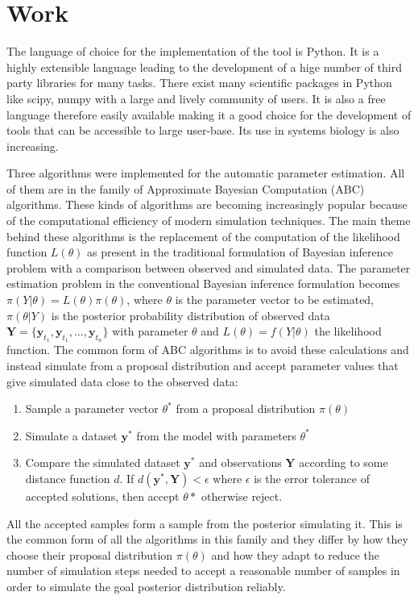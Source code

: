 \documentclass[12pt,a4paper,titlepage]{article}
\begin{document}
\section{Work}
The language of choice for the implementation of the tool is Python. It is a highly extensible language leading to the development of a hige number of third party libraries for many tasks. There exist many scientific packages in Python like scipy\cite{scipy}, numpy with a large and lively community of users. It is also a free language therefore easily available making it a good choice for the development of tools that can be accessible to large user-base. Its use in systems biology is also increasing\cite{myers2007python, olivier2002modelling}.

Three algorithms were implemented for the automatic parameter estimation. All of them are in the family of Approximate Bayesian Computation (ABC) algorithms. These kinds of algorithms are becoming increasingly popular because of the computational efficiency of modern simulation techniques. The main theme behind these algorithms is the replacement of the computation of the likelihood function $L(\theta)$ as present in the traditional formulation of Bayesian inference problem with a comparison between observed and simulated data.  The parameter estimation problem in the conventional Bayesian inference formulation becomes $\pi(Y | \theta) = L(\theta)\pi(\theta)$, where $\theta$ is the parameter vector to be estimated, $\pi(\theta | Y)$ is the posterior probability distribution of observed data $\mathbf{Y} = \{\mathbf{y}_{t_{1}}, \mathbf{y}_{t_{1}}, \dots, \mathbf{y}_{t_{n}}\} $ with parameter $\theta$ and $L(\theta) = f(Y | \theta)$ the likelihood function. The common form of ABC algorithms is to avoid these calculations and instead simulate from a proposal distribution and accept parameter values that give simulated data close to the observed data:
\begin{enumerate}[noitemsep]
\item{Sample a parameter vector $\theta^*$ from a proposal distribution $\pi(\theta) $}
\item{Simulate a dataset $\mathbf{y}^*$ from the model with parameters $\theta^*$}
\item{Compare the simulated dataset $\mathbf{y}^*$ and observations $\mathbf{Y}$ according to some distance function $d$. If $d(\mathbf{y}^*, \mathbf{Y}) < \epsilon$ where $\epsilon$ is the error tolerance of accepted solutions, then accept $\theta*$ otherwise reject. }
\end{enumerate}
All the accepted samples form a sample from the posterior simulating it. This is the common form of all the algorithms in this family and they differ by how they choose their proposal distribution $\pi(\theta) $ and how they adapt to reduce the number of simulation steps needed to accept a reasonable number of samples in order to simulate the goal posterior distribution reliably.
\end{document}
